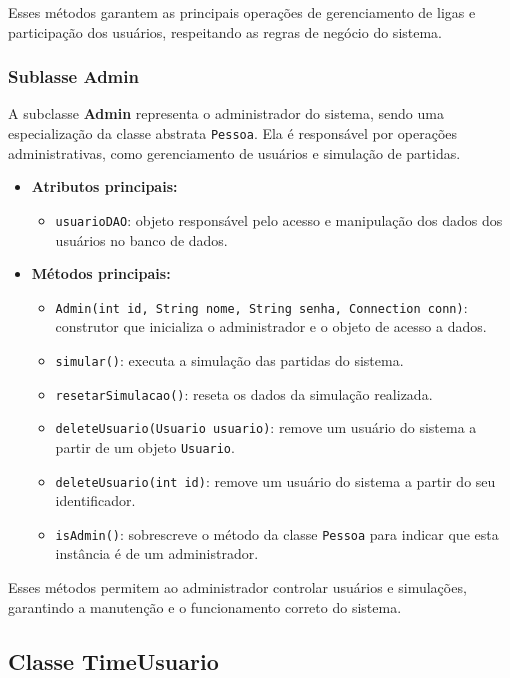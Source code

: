 \documentclass[12pt]{article}
\begin{document}
Esses métodos garantem as principais operações de gerenciamento de ligas e participação dos usuários, respeitando as regras de negócio do sistema.

\subsubsection{Sublasse Admin}

A subclasse \textbf{Admin} representa o administrador do sistema, sendo uma especialização da classe abstrata \texttt{Pessoa}. Ela é responsável por operações administrativas, como gerenciamento de usuários e simulação de partidas.

\begin{itemize}
  \item \textbf{Atributos principais:}
        \begin{itemize}
          \item \texttt{usuarioDAO}: objeto responsável pelo acesso e manipulação dos dados dos usuários no banco de dados.
        \end{itemize}
  \item \textbf{Métodos principais:}
        \begin{itemize}
          \item \texttt{Admin(int id, String nome, String senha, Connection conn)}: construtor que inicializa o administrador e o objeto de acesso a dados.
          \item \texttt{simular()}: executa a simulação das partidas do sistema.
          \item \texttt{resetarSimulacao()}: reseta os dados da simulação realizada.
          \item \texttt{deleteUsuario(Usuario usuario)}: remove um usuário do sistema a partir de um objeto \texttt{Usuario}.
          \item \texttt{deleteUsuario(int id)}: remove um usuário do sistema a partir do seu identificador.
          \item \texttt{isAdmin()}: sobrescreve o método da classe \texttt{Pessoa} para indicar que esta instância é de um administrador.
        \end{itemize}
\end{itemize}

Esses métodos permitem ao administrador controlar usuários e simulações, garantindo a manutenção e o funcionamento correto do sistema.

\subsection{Classe TimeUsuario}
\end{document}
